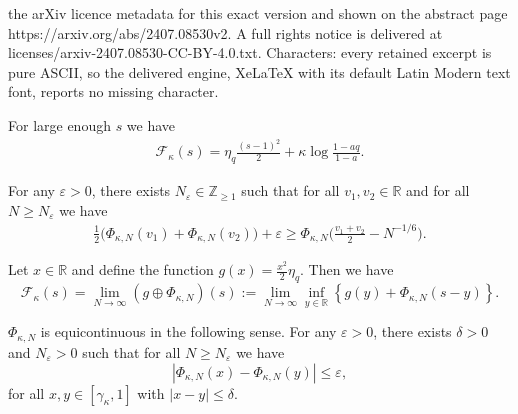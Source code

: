 \documentclass[10pt,a4paper]{amsart}
\newcommand{\R}{\mathbb{R}}
\newcommand{\Z}{\mathbb{Z}}
\newcommand{\e}{\varepsilon}
\newcommand{\lln}{\gamma_\kappa}
\newcommand{\logq}{\eta_q}
\begin{document}
the arXiv licence metadata for this exact version and shown on the abstract page https://arxiv.org/abs/2407.08530v2. A full rights notice is delivered at licenses/arxiv-2407.08530-CC-BY-4.0.txt. Characters: every retained excerpt is pure ASCII, so the delivered engine, XeLaTeX with its default Latin Modern text font, reports no missing character.
\begin{proposition} \label{p.energystab} For large enough $s$ we have 
\begin{align}\label{f.para}
    \mathcal{F}_\kappa(s)=\logq \frac{(s-1)^2}{2}+\kappa \log \frac{1-aq}{1-a}.
\end{align}
\end{proposition}

\begin{proposition}
\label{cor:tconvex} For any $\e>0$, there exists $N_{\e} \in \Z_{\ge 1}$ such that for all $v_1,v_2\in \R$ and for all  $N\ge N_\e$ we have
\begin{align*}
\frac12\big(\Phi_{\kappa,N}(v_1)+\Phi_{\kappa,N}(v_2)\big)+\e \ge \Phi_{\kappa,N}\bigg(\frac{v_1+v_2}{2}-N^{-1/6}\bigg).
\end{align*}
\end{proposition}

\begin{proposition} \label{prop:f_limit_g+T}
				Let $x \in \mathbb{R}$ and define the function $g(x)=\frac{x^2}{2}\logq$. Then  we have
				\begin{equation}
                \label{eq:lim_inf_conv}
					\mathcal{F}_\kappa(s) = \lim_{N\to \infty}  \left( g \oplus \Phi_{\kappa,N} \right)(s):=\lim_{N\to \infty}\inf_{y \in \mathbb{R}} \left\{ g(y) + \Phi_{\kappa,N}(s-y) \right\}.
				\end{equation}
			\end{proposition}

\begin{proposition}\label{prop:equicont} $\Phi_{\kappa,N}$ is equicontinuous in the following sense. For any $\varepsilon>0$, there exists $\delta>0$ and $N_\varepsilon>0$ such that for all $N\ge N_\varepsilon$ we have
    $$
    |\Phi_{\kappa,N}(x)-\Phi_{\kappa,N}(y)|\le \varepsilon,
    $$ 
    for all $x,y\in[\lln,1]$ with $|x-y|\le \delta$.
\end{proposition}
\end{document}
